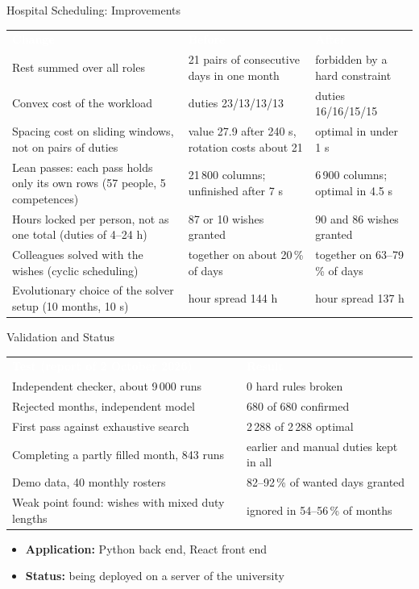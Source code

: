 \documentclass[aspectratio=43,xcolor={svgnames,table},t]{beamer}
\newcommand{\head}[1]{\textcolor{white}{\bfseries #1}}
\begin{document}
\begin{frame}{Hospital Scheduling: Improvements}
  \centering
  \scriptsize
  \begin{tabular}{@{}L{0.42\textwidth}L{0.26\textwidth}L{0.24\textwidth}@{}}
    \head{Change} & \head{Before} & \head{After}\\
    Rest summed over all roles & 21 pairs of consecutive days in one month & forbidden by a hard constraint\\
    Convex cost of the workload & duties 23/13/13/13 & duties 16/16/15/15\\
    Spacing cost on sliding windows, not on pairs of duties & value 27.9 after 240 s, rotation costs about 21 & optimal in under 1 s\\
    Lean passes: each pass holds only its own rows (57 people, 5 competences) & 21\,800 columns; unfinished after 7 s & 6\,900 columns; optimal in 4.5 s\\
    Hours locked per person, not as one total (duties of 4--24 h) & 87 or 10 wishes granted & 90 and 86 wishes granted\\
    Colleagues solved with the wishes (cyclic scheduling) & together on about 20\,\% of days & together on 63--79\,\% of days\\
    Evolutionary choice of the solver setup (10 months, 10 s) & hour spread 144 h & hour spread 137 h\\
    \bottomrule
  \end{tabular}
\end{frame}

\begin{frame}{Validation and Status}
  \centering
  \footnotesize
  \begin{tabular}{@{}L{0.5\textwidth}L{0.44\textwidth}@{}}
    \head{Test (report of 2 October 2026)} & \head{Result}\\
    Independent checker, about 9\,000 runs & 0 hard rules broken\\
    Rejected months, independent model & 680 of 680 confirmed\\
    First pass against exhaustive search & 2\,288 of 2\,288 optimal\\
    Completing a partly filled month, 843 runs & earlier and manual duties kept in all\\
    Demo data, 40 monthly rosters & 82--92\,\% of wanted days granted\\
    Weak point found: wishes with mixed duty lengths & ignored in 54--56\,\% of months\\
    \bottomrule
  \end{tabular}

  \vfill
  \raggedright
  \normalsize
  \begin{itemize}
    \item \textbf{Application:} Python back end, React front end
    \item \textbf{Status:} being deployed on a server of the university
  \end{itemize}
\end{frame}
\end{document}
